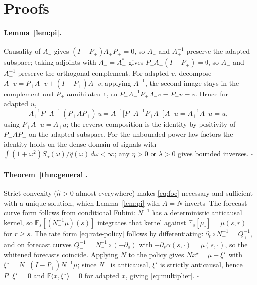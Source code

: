 \documentclass[11pt]{article}
\newcommand{\E}{\mathbb{E}}
\theoremstyle{plain}
\theoremstyle{definition}
\theoremstyle{remark}
\begin{document}
\newpage 
\appendix
\section{Proofs}\label{app:proofs}

\paragraph{Lemma~\ref{lem:pi}.} Causality of $A_+$ gives $(I-P_+)A_+P_+=0$, so $A_+$ and $A_+^{-1}$ preserve the adapted subspace; taking adjoints with $A_-=A_+^\ast$ gives $P_+A_-(I-P_+)=0$, so $A_-$ and $A_-^{-1}$ preserve the orthogonal complement. For adapted $v$, decompose $A_-v=P_+A_-v+(I-P_+)A_-v$; applying $A_-^{-1}$, the second image stays in the complement and $P_+$ annihilates it, so $P_+A_-^{-1}P_+A_-v=P_+v=v$. Hence for adapted $u$,
\[
A_+^{-1}P_+A_-^{-1}\,(P_+AP_+)\,u = A_+^{-1}\bigl[P_+A_-^{-1}P_+A_-\bigr]A_+u = A_+^{-1}A_+u = u,
\]
using $P_+A_+u=A_+u$; the reverse composition is the identity by positivity of $P_+AP_+$ on the adapted subspace. For the unbounded power-law factors the identity holds on the dense domain of signals with $\int(1+\omega^2)S_\alpha(\omega)/\hat q(\omega)\,d\omega<\infty$; any $\eta>0$ or $\lambda>0$ gives bounded inverses. $\square$

\paragraph{Theorem~\ref{thm:general}.} Strict convexity ($\hat n>0$ almost everywhere) makes \eqref{eq:foc} necessary and sufficient with a unique solution, which Lemma~\ref{lem:pi} with $A=N$ inverts. The forecast-curve form follows from conditional Fubini: $N_-^{-1}$ has a deterministic anticausal kernel, so $\E_s[(N_-^{-1}\mu)(s)]$ integrates that kernel against $\E_s[\mu_r]=\bar\mu(s,r)$ for $r\ge s$. The rate form \eqref{eq:rate-policy} follows by differentiating: $\partial_t\circ N_+^{-1}=Q_+^{-1}$, and on forecast curves $Q_-^{-1}=N_-^{-1}\circ(-\partial_s)$ with $-\partial_s\bar\alpha(s,\cdot)=\bar\mu(s,\cdot)$, so the whitened forecasts coincide. Applying $N$ to the policy gives $Nx^\star=\mu-\xi^\star$ with $\xi^\star=N_-(I-P_+)N_-^{-1}\mu$; since $N_-$ is anticausal, $\xi^\star$ is strictly anticausal, hence $P_+\xi^\star=0$ and $\E\langle x,\xi^\star\rangle=0$ for adapted $x$, giving \eqref{eq:multiplier}. $\square$
\end{document}
